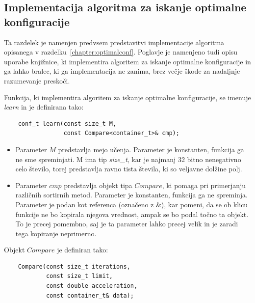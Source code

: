 \documentclass[a4paper,oneside,12pt]{article}
\begin{document}
\subsection{Implementacija algoritma za iskanje optimalne konfiguracije}
\label{chapter:optimalconfimplementation}
Ta razdelek je namenjen predvsem predstavitvi implementacije algoritma opisanega v
razdelku~\ref{chapter:optimalconf}. Poglavje je namenjeno tudi opisu uporabe knjižnice, ki
implementira algoritem za iskanje optimalne konfiguracije in ga lahko bralec, ki ga
implementacija ne zanima, brez večje škode za nadaljnje razumevanje preskoči.

Funkcija, ki implementira algoritem za iskanje optimalne konfiguracije, 
se imenuje \emph{learn} in je definirana tako:

\begin{lstlisting}
    conf_t learn(const size_t M, 
                 const Compare<container_t>& cmp);
\end{lstlisting}

\begin{itemize}
  \item Parameter $M$ predstavlja mejo učenja. Parameter je
    konstanten, funkcija ga ne sme spreminjati. M ima tip \emph{size\_t}, kar je najmanj 32
    bitno nenegativno celo število, torej predstavlja ravno tista števila, ki so veljavne
    dolžine polj.
  \item Parameter $cmp$ predstavlja objekt tipa $Compare$, ki pomaga pri primerjanju
    različnih sortirnih metod. Parameter je konstanten, funkcija ga ne spreminja.
    Parameter je podan kot referenca (označeno z \&), kar pomeni, da se ob klicu funkcije
    ne bo kopirala njegova vrednost, ampak se bo podal točno ta objekt. To je precej
    pomembno, saj je  ta parameter lahko precej velik in je zaradi tega
    kopiranje neprimerno. 
\end{itemize}

Objekt $Compare$ je definiran tako:
\begin{lstlisting}
    Compare(const size_t iterations, 
            const size_t limit, 
            const double acceleration, 
            const container_t& data);
\end{lstlisting}
\end{document}
